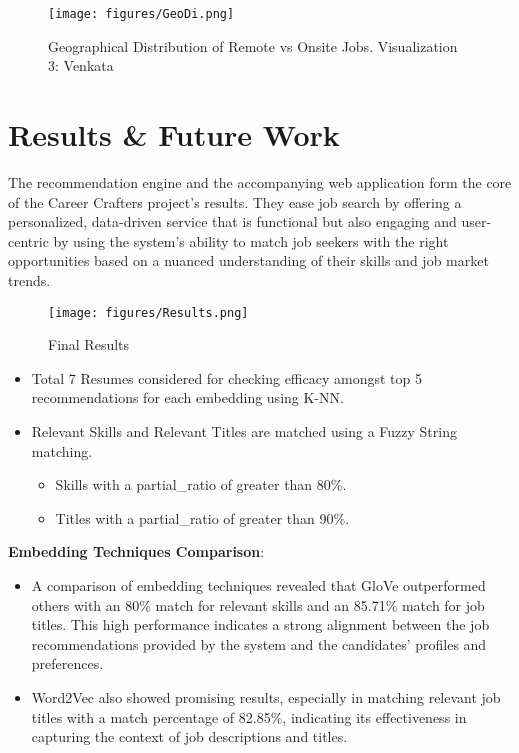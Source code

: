 \documentclass[a4paper,10pt]{article}
\begin{document}
\begin{figure}[ht]
    \centering
    \texttt{[image: figures/GeoDi.png]}
    \caption{Geographical Distribution of Remote vs Onsite Jobs. Visualization 3: Venkata}
    \label{GeoDi}
    \end{figure}


\section{Results \& Future Work}

The recommendation engine and the accompanying web application form the core of the Career Crafters project's results. They ease job search by offering a personalized, data-driven service that is functional but also engaging and user-centric by using the system's ability to match job seekers with the right opportunities based on a nuanced understanding of their skills and job market trends.

 \begin{figure}[ht]
    \centering
    \texttt{[image: figures/Results.png]}
    \caption{Final Results}
    \label{fig_results}
    \end{figure}

\begin{itemize}
    \item Total 7 Resumes considered for checking efficacy amongst top 5 recommendations for each embedding using K-NN.

    \item  Relevant Skills and Relevant Titles are matched using a Fuzzy String matching.
    \begin{itemize}
    	\item Skills with a partial\_ratio of greater than 80\%.
    	\item Titles with a partial\_ratio of greater than 90\%.
    \end{itemize}
\end{itemize}

\textbf{Embedding Techniques Comparison}:
\begin{itemize}
 \item A comparison of embedding techniques revealed that GloVe outperformed others with an 80\% match for relevant skills and an 85.71\% match for job titles. This high performance indicates a strong alignment between the job recommendations provided by the system and the candidates' profiles and preferences.

 \item Word2Vec also showed promising results, especially in matching relevant job titles with a match percentage of 82.85\%, indicating its effectiveness in capturing the context of job descriptions and titles.
\end{itemize}
\end{document}
